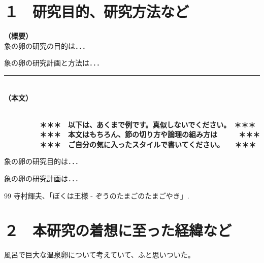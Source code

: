 \documentclass[11pt,a4j,dvipdfmx]{jarticle} 					%
\newcommand{\研究課題名}{象の卵}
\newcommand{\研究機関名}{逢坂大学}
\newcommand{\研究代表者氏名}{湯川秀樹}
\newcommand{\研究期間の最終元号年度}{34}  %
\begin{document}

\section{１　研究目的、研究方法など}

\noindent
\textbf{（概要）}\\
	象の卵の研究の目的は．．．	

	象の卵の研究計画と方法は．．．
	\vspace*{10zw}	%

\noindent
\rule{\linewidth}{1pt}\\
\noindent
\textbf{（本文）}
\JSPSInstructions	%

\textbf{\\　　　　　＊＊＊　以下は、あくまで例です。真似しないでください。　＊＊＊\\
　　　　　＊＊＊　本文はもちろん、節の切り方や論理の組み方は　　　＊＊＊\\
　　　　　＊＊＊　ご自分の気に入ったスタイルで書いてください。　　＊＊＊}

	 象の卵の研究目的は．．．

	象の卵の研究計画は．．．

	\vspace{1cm}
	\begin{thebibliography}{99}
		 寺村輝夫、「ぼくは王様 - ぞうのたまごのたまごやき」.
	\end{thebibliography}




\section{２　本研究の着想に至った経緯など}

		風呂で巨大な温泉卵について考えていて、ふと思いついた。
\end{document}
